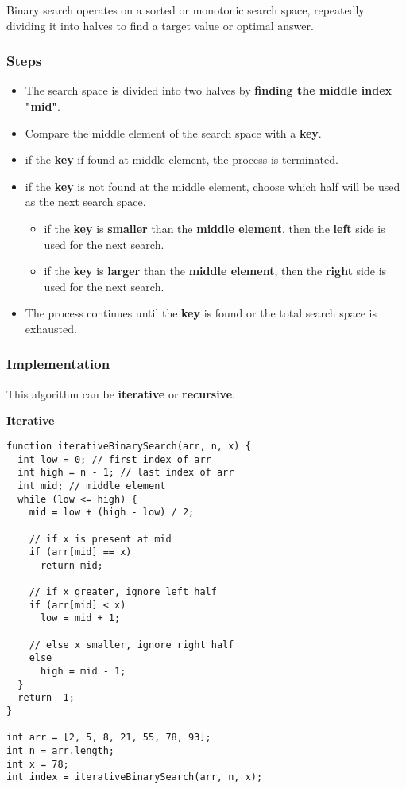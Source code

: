 Binary search operates on a sorted or monotonic search space, repeatedly dividing it into halves to find a target value or optimal answer.

\subsubsection{Steps}

\begin{itemize}
  \item The search space is divided into two halves by \textbf{finding the middle index "mid"}.
  \item Compare the middle element of the search space with a \textbf{key}.
  \item if the \textbf{key} if found at middle element, the process is terminated.
  \item if the \textbf{key}  is not found at the middle element, choose which half will be used as the next search space.
  \begin{itemize}
    \item if the \textbf{key} is \textbf{smaller} than the \textbf{middle element}, then the \textbf{left} side is used for the next search.
    \item if the \textbf{key} is \textbf{larger} than the \textbf{middle element}, then the \textbf{right} side is used for the next search.
  \end{itemize}
  \item The process continues until the \textbf{key} is found or the total search space is exhausted.
\end{itemize}

\subsubsection{Implementation}

This algorithm can be \textbf{iterative} or \textbf{recursive}.

\textbf{Iterative}

\begin{lstlisting}[style=general]
function iterativeBinarySearch(arr, n, x) {
  int low = 0; // first index of arr
  int high = n - 1; // last index of arr
  int mid; // middle element
  while (low <= high) {
    mid = low + (high - low) / 2;

    // if x is present at mid
    if (arr[mid] == x)
      return mid;

    // if x greater, ignore left half
    if (arr[mid] < x)
      low = mid + 1;

    // else x smaller, ignore right half
    else
      high = mid - 1;
  }
  return -1;
}

int arr = [2, 5, 8, 21, 55, 78, 93];
int n = arr.length;
int x = 78;
int index = iterativeBinarySearch(arr, n, x);
\end{lstlisting}

